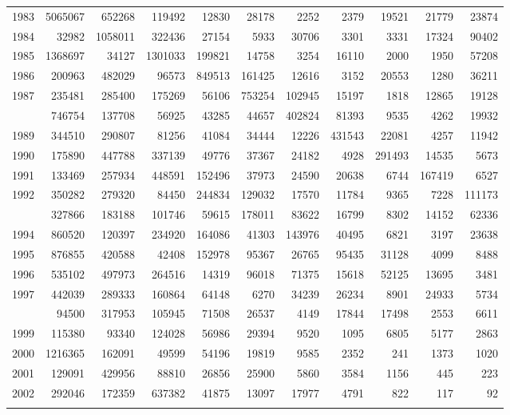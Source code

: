 \documentclass[
]{article}
\begin{document}
\begin{longtable}[t]{lrrrrrrrrrr}
1983 & 5065067 & 652268 & 119492 & 12830 & 28178 & 2252 & 2379 & 19521 & 21779 & 23874\\
1984 & 32982 & 1058011 & 322436 & 27154 & 5933 & 30706 & 3301 & 3331 & 17324 & 90402\\
1985 & 1368697 & 34127 & 1301033 & 199821 & 14758 & 3254 & 16110 & 2000 & 1950 & 57208\\
1986 & 200963 & 482029 & 96573 & 849513 & 161425 & 12616 & 3152 & 20553 & 1280 & 36211\\
1987 & 235481 & 285400 & 175269 & 56106 & 753254 & 102945 & 15197 & 1818 & 12865 & 19128\\
\addlinespace
1988 & 746754 & 137708 & 56925 & 43285 & 44657 & 402824 & 81393 & 9535 & 4262 & 19932\\
1989 & 344510 & 290807 & 81256 & 41084 & 34444 & 12226 & 431543 & 22081 & 4257 & 11942\\
1990 & 175890 & 447788 & 337139 & 49776 & 37367 & 24182 & 4928 & 291493 & 14535 & 5673\\
1991 & 133469 & 257934 & 448591 & 152496 & 37973 & 24590 & 20638 & 6744 & 167419 & 6527\\
1992 & 350282 & 279320 & 84450 & 244834 & 129032 & 17570 & 11784 & 9365 & 7228 & 111173\\
\addlinespace
1993 & 327866 & 183188 & 101746 & 59615 & 178011 & 83622 & 16799 & 8302 & 14152 & 62336\\
1994 & 860520 & 120397 & 234920 & 164086 & 41303 & 143976 & 40495 & 6821 & 3197 & 23638\\
1995 & 876855 & 420588 & 42408 & 152978 & 95367 & 26765 & 95435 & 31128 & 4099 & 8488\\
1996 & 535102 & 497973 & 264516 & 14319 & 96018 & 71375 & 15618 & 52125 & 13695 & 3481\\
1997 & 442039 & 289333 & 160864 & 64148 & 6270 & 34239 & 26234 & 8901 & 24933 & 5734\\
\addlinespace
1998 & 94500 & 317953 & 105945 & 71508 & 26537 & 4149 & 17844 & 17498 & 2553 & 6611\\
1999 & 115380 & 93340 & 124028 & 56986 & 29394 & 9520 & 1095 & 6805 & 5177 & 2863\\
2000 & 1216365 & 162091 & 49599 & 54196 & 19819 & 9585 & 2352 & 241 & 1373 & 1020\\
2001 & 129091 & 429956 & 88810 & 26856 & 25900 & 5860 & 3584 & 1156 & 445 & 223\\
2002 & 292046 & 172359 & 637382 & 41875 & 13097 & 17977 & 4791 & 822 & 117 & 92\\
\addlinespace

\end{longtable}
\end{document}
